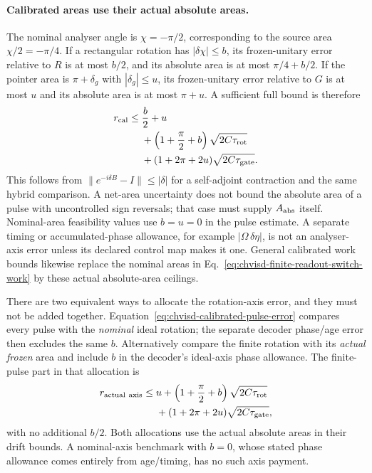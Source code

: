 \paragraph{Calibrated areas use their actual absolute areas.}
The nominal analyser angle is $\chi=-\pi/2$, corresponding to the source
area $\chi/2=-\pi/4$. If a rectangular rotation has
$|\delta\chi|\leq b$, its frozen-unitary error relative to $R$ is at
most $b/2$, and its absolute area is at most $\pi/4+b/2$. If the pointer
area is $\pi+\delta_g$ with $|\delta_g|\leq u$, its frozen-unitary
error relative to $G$ is at most $u$ and its absolute area is at most
$\pi+u$. A sufficient full bound is therefore
\begin{equation}
 \begin{aligned}
 r_{\rm cal}\leq{}&\frac b2+u\\
   &+\left(1+\frac\pi2+b\right)\sqrt{2C\tau_{\rm rot}}\\
   &+(1+2\pi+2u)\sqrt{2C\tau_{\rm gate}}.
 \end{aligned}
 \label{eq:chvisd-calibrated-pulse-error}
\end{equation}
This follows from $\|e^{-i\delta B}-I\|\leq|\delta|$ for a
self-adjoint contraction and the same hybrid comparison. A net-area
uncertainty does not bound the absolute area of a pulse with uncontrolled
sign reversals; that case must supply $A_{\rm abs}$ itself. Nominal-area
feasibility values use $b=u=0$ in the pulse estimate. A separate timing
or accumulated-phase allowance, for example $|\Omega\,\delta\eta|$,
is not an analyser-axis error unless its declared control map makes it
one. General calibrated work bounds likewise replace the nominal areas
in Eq.~\eqref{eq:chvisd-finite-readout-switch-work} by these actual
absolute-area ceilings.

There are two equivalent ways to allocate the rotation-axis error, and
they must not be added together. Equation~\eqref{eq:chvisd-calibrated-pulse-error}
compares every pulse with the \emph{nominal} ideal rotation; the separate
decoder phase/age error then excludes the same $b$. Alternatively compare
the finite rotation with its \emph{actual frozen} area and include $b$ in
the decoder's ideal-axis phase allowance. The finite-pulse part in that
allocation is
\begin{equation}
 \begin{aligned}
 r_{\rm actual\ axis}\leq{}&u
   +\left(1+\frac\pi2+b\right)\sqrt{2C\tau_{\rm rot}}\\
   &+(1+2\pi+2u)\sqrt{2C\tau_{\rm gate}},
 \end{aligned}
 \label{eq:chvisd-actual-axis-drift-budget}
\end{equation}
with no additional $b/2$. Both allocations use the actual absolute areas
in their drift bounds. A nominal-axis benchmark with $b=0$, whose stated
phase allowance comes entirely from age/timing, has no such axis payment.

